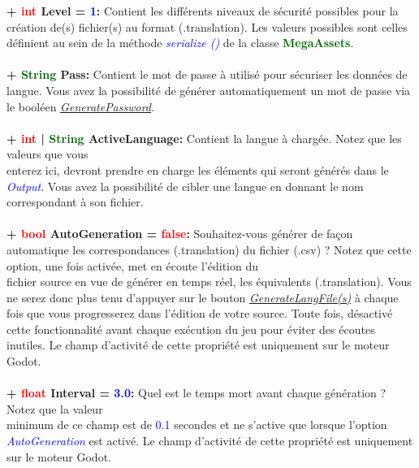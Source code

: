 \documentclass[a4paper, 11pt]{article}
\begin{document}
	\textbf{+ \textcolor{red}{int} \hypertarget{idx}{Level} = \textcolor{blue}{1}:} Contient les différents
	niveaux de sécurité possibles pour la création de(s) fichier(s) au format (.translation). Les valeurs
	possibles sont celles définient au sein de la méthode \textit{\textcolor{blue}{serialize ()}} de la
	classe \textbf{\textcolor{darkgreen}{MegaAssets}}.\\\\
	\textbf{+ \textcolor{darkgreen}{String} \hypertarget{pass}{Pass}:} Contient le mot de passe à utilisé
	pour sécuriser les données de langue. Vous avez la possibilité de générer automatiquement un mot de
	passe via le booléen \textit{\hyperlink{genpass}{GeneratePassword}}.\\\\
	\textbf{+ \textcolor{red}{int} | \textcolor{darkgreen}{String} ActiveLanguage:} Contient la langue à
	chargée. Notez que les valeurs que vous \\enterez ici, devront prendre en charge les éléments qui seront
	générés dans le \textcolor{blue}{\textit{Output}}. Vous avez la possibilité de cibler une langue en
	donnant le nom correspondant à son fichier.\\\\
	\newpage \textbf{+ \textcolor{red}{bool} \hypertarget{autogen}{AutoGeneration} = \textcolor{red}
	{false}:} Souhaitez-vous générer de façon automatique les correspondances (.translation) du fichier
	(.csv) ? Notez que cette option, une fois activée, met en écoute l'édition du \\fichier source en vue de
	générer en temps réel, les équivalents (.translation). Vous ne serez donc plus tenu d'appuyer sur le
	bouton \textit{\hyperlink{genlanglfile}{GenerateLangFile(s)}} à chaque fois que vous progresserez dans
	l'édition de votre source. Toute fois, désactivé cette fonctionnalité avant chaque exécution du jeu pour
	éviter des écoutes inutiles. Le champ d'activité de cette propriété est uniquement sur le moteur Godot.
	\\\\
	\textbf{+ \textcolor{red}{float} Interval = \textcolor{blue}{3.0}:} Quel est le temps mort avant chaque 
	génération ? Notez que la valeur \\minimum de ce champ est de \textcolor{blue}{0.1} secondes et ne 
	s'active que lorsque l'option \textcolor{blue}{\textit{AutoGeneration}} est activé. Le champ d'activité 
	de cette propriété est uniquement sur le moteur Godot.\\\\
\end{document}
